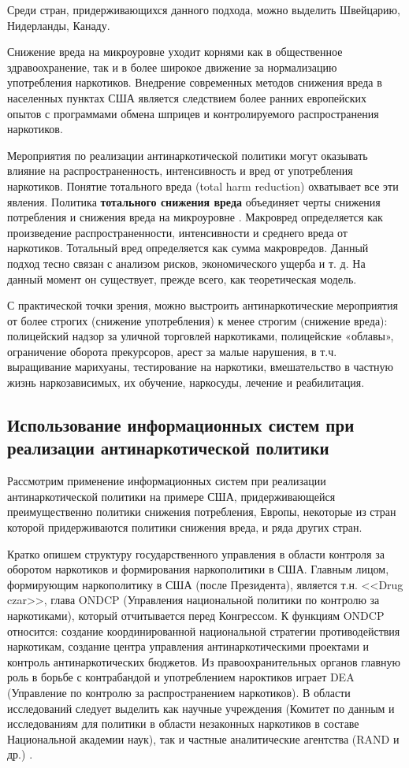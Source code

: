 Среди стран, придерживающихся данного подхода, можно выделить Швейцарию, 
Нидерланды, Канаду.
 
Снижение вреда на микроуровне уходит корнями как в общественное здравоохранение, 
так и в более широкое движение за нормализацию употребления наркотиков. 
Внедрение современных методов снижения вреда в населенных пунктах США является 
следствием более ранних европейских опытов с программами обмена шприцев и 
контролируемого распространения наркотиков. 

Мероприятия по реализации антинаркотической политики могут оказывать влияние на 
распространенность, интенсивность и вред от употребления наркотиков. Понятие 
тотального вреда (total harm reduction) охватывает все эти явления. Политика 
\textbf{тотального снижения вреда} объединяет черты снижения потребления и 
снижения вреда на микроуровне \cite{MacCoun2001}. Макровред определяется как 
произведение  распространенности, интенсивности и среднего вреда от наркотиков. 
Тотальный вред определяется как сумма макровредов. Данный подход тесно связан с 
анализом рисков, экономического ущерба и т. д. На данный момент он существует, 
прежде всего, как теоретическая модель. 

С практической точки зрения, можно выстроить антинаркотические мероприятия от 
более строгих (снижение употребления) к менее строгим (снижение вреда): 
полицейский надзор за уличной торговлей наркотиками, полицейские «облавы», 
ограничение оборота прекурсоров, арест за малые нарушения, в т.ч. выращивание 
марихуаны, тестирование на наркотики, вмешательство в частную жизнь 
наркозависимых, их обучение, наркосуды, лечение и реабилитация.

\subsection{Использование информационных систем при реализации антинаркотической 
    политики}

Рассмотрим применение информационных систем при реализации антинаркотической 
политики на примере США, придерживающейся преимущественно политики снижения 
потребления, Европы, некоторые из стран которой придерживаются политики
снижения вреда, и ряда других стран. 

Кратко опишем структуру государственного управления в области контроля за
оборотом наркотиков и формирования наркополитики в США. Главным лицом,
формирующим наркополитику в США (после Президента), является т.н. <<Drug czar>>,
глава ONDCP (Управления национальной политики по контролю за наркотиками),
который отчитывается перед Конгрессом. К функциям ONDCP относится: создание
координированной национальной стратегии противодействия наркотикам, создание
центра управления антинаркотическими проектами и контроль антинаркотических
бюджетов.  Из правоохранительных органов главную роль в борьбе с контрабандой и
употреблением нароктиков играет DEA (Управление по контролю за распространением
наркотиков). В области исследований следует выделить как научные учреждения
(Комитет по данным и исследованиям для политики в области незаконных наркотиков
в составе Национальной академии наук), так и частные аналитические агентства
(RAND и др.) \cite{Robinson2007,InfAmerPolicy2001}.

